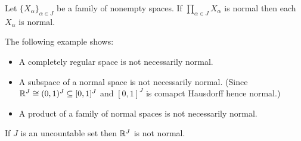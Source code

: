 \begin{corollary}
    Let $\{ X_\alpha \}_{\alpha \in J}$ be a family of nonempty spaces. If
    $\prod_{\alpha \in J} X_\alpha$ is normal then each $X_\alpha$ is normal.
\end{corollary}

The following example shows:
\begin{itemize}
    \item A completely regular space is not necessarily normal.
    \item A subspace of a normal space is not necessarily normal.
    (Since $\mathbb{R}^J \cong (0,1)^J \subseteq [0,1]^J$ and $[0,1]^J$
    is comapct Hausdorff hence normal.)
    \item A product of a family of normal spaces is not necessarily normal.
\end{itemize}

\begin{example}[Choice]
    If $J$ is an uncountable set then $\mathbb{R}^J$ is not normal.
\end{example}

